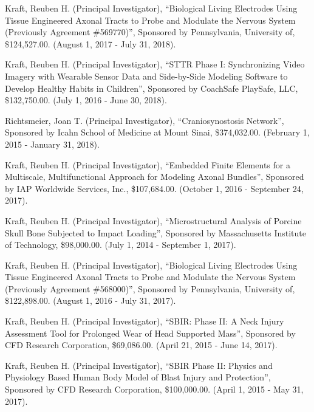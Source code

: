 \documentclass[a4paper,10pt]{article}
\begin{document}
        \noindent Kraft, Reuben H. (Principal Investigator), ``Biological Living Electrodes Using Tissue Engineered Axonal Tracts to Probe and Modulate the Nervous System (Previously Agreement \#569770)'', Sponsored by Pennsylvania, University of, \$124,527.00. (August 1, 2017 - July 31, 2018).\vspace{0.25cm}
        
        \noindent Kraft, Reuben H. (Principal Investigator), ``STTR Phase I:    Synchronizing Video Imagery with Wearable Sensor Data and Side-by-Side Modeling Software to Develop Healthy Habits in Children'', Sponsored by CoachSafe PlaySafe, LLC, \$132,750.00. (July 1, 2016 - June 30, 2018).\vspace{0.25cm}
        
        \noindent Richtsmeier, Joan T. (Principal Investigator), ``Craniosynostosis Network'', Sponsored by Icahn School of Medicine at Mount Sinai, \$374,032.00. (February 1, 2015 - January 31, 2018).\vspace{0.25cm}
        
        \noindent Kraft, Reuben H. (Principal Investigator), ``Embedded Finite Elements for a Multiscale, Multifunctional Approach for Modeling Axonal Bundles'', Sponsored by IAP Worldwide Services, Inc., \$107,684.00. (October 1, 2016 - September 24, 2017).\vspace{0.25cm}
        
        \noindent Kraft, Reuben H. (Principal Investigator), ``Microstructural Analysis of Porcine Skull Bone Subjected to Impact Loading'', Sponsored by Massachusetts Institute of Technology, \$98,000.00. (July 1, 2014 - September 1, 2017).\vspace{0.25cm}
        
        \noindent Kraft, Reuben H. (Principal Investigator), ``Biological Living Electrodes Using Tissue Engineered Axonal Tracts to Probe and Modulate the Nervous System (Previously Agreement \#568000)'', Sponsored by Pennsylvania, University of, \$122,898.00. (August 1, 2016 - July 31, 2017).\vspace{0.25cm}
        
        \noindent Kraft, Reuben H. (Principal Investigator), ``SBIR: Phase II: A Neck Injury Assessment Tool for Prolonged Wear of Head Supported Mass'', Sponsored by CFD Research Corporation, \$69,086.00. (April 21, 2015 - June 14, 2017).\vspace{0.25cm}
        
        \noindent Kraft, Reuben H. (Principal Investigator), ``SBIR Phase II:    Physics and Physiology Based Human Body Model of Blast Injury and Protection'', Sponsored by CFD Research Corporation, \$100,000.00. (April 1, 2015 - May 31, 2017).\vspace{0.25cm}
        
\end{document}
